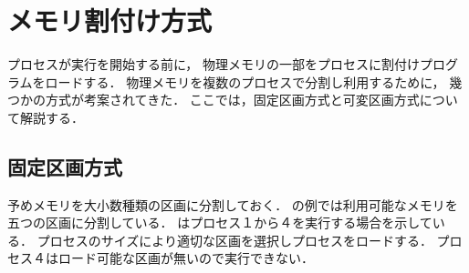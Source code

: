\chapter{メモリ割付け方式}
プロセスが実行を開始する前に，
物理メモリの一部をプロセスに割付けプログラムをロードする．
物理メモリを複数のプロセスで分割し利用するために，
幾つかの方式が考案されてきた．
ここでは，固定区画方式と可変区画方式について解説する．

\section{固定区画方式}
予めメモリを大小数種類の区画に分割しておく．
の例では利用可能なメモリを五つの区画に分割している．
はプロセス１から４を実行する場合を示している．
プロセスのサイズにより適切な区画を選択しプロセスをロードする．
プロセス４はロード可能な区画が無いので実行できない．

